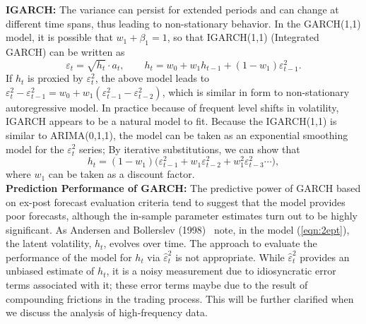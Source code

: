 \noindent\textbf{IGARCH:} The variance can persist for extended periods and can change at different time spans, thus leading to non-stationary behavior. In the GARCH(1,1) model, it is possible that $w_1 + \beta_1 = 1$, so that IGARCH(1,1) (Integrated GARCH) can be written as
	\begin{equation}\label{eqn:2eptsqrt}
	\varepsilon_t = \sqrt{h_t} \cdot a_t,\qquad h_t = w_0 + w_1h_{t-1} + (1 - w_1)\varepsilon_{t-1}^2.
	\end{equation}
If $h_t$ is proxied by $\varepsilon_t^2$, the above model leads to $\varepsilon_t^2 - \varepsilon_{t-1}^2 = w_0 + w_1(\varepsilon_{t-1}^2 - \varepsilon_{t-2}^2)$, which is similar in form to non-stationary autoregressive model. In practice because of frequent level shifts in volatility, IGARCH appears to be a natural model to fit. Because the IGARCH(1,1) is similar to ARIMA(0,1,1), the model can be taken as an exponential smoothing model for the $\varepsilon_t^2$ series; By iterative substitutions, we can show that
	\begin{equation}\label{eqn:2ht1w}
	h_t = (1 - w_1) \big( \varepsilon_{t-1}^2 + w_1\varepsilon_{t-2}^2 + w_1^2\varepsilon_{t-3}^2 \cdots \big),
	\end{equation}
where $w_1$ can be taken as a discount factor. \\


\noindent\textbf{Prediction Performance of GARCH:} The predictive power of GARCH based on ex-post forecast evaluation criteria tend to suggest that the model provides poor forecasts, although the in-sample parameter estimates turn out to be highly significant. As Andersen and Bollerslev (1998)~\cite{andersen1998} note, in the model (\ref{eqn:2ept}), the latent volatility, $h_t$, evolves over time. The approach to evaluate the performance of the model for $h_t$ via $\hat{\varepsilon}_t^2$ is not appropriate. While $\hat{\varepsilon}_t^2$ provides an unbiased estimate of $h_t$, it is a noisy measurement due to idiosyncratic error terms associated with it; these error terms maybe due to the result of compounding frictions in the trading process. This will be further clarified when we discuss the analysis of high-frequency data. \\


